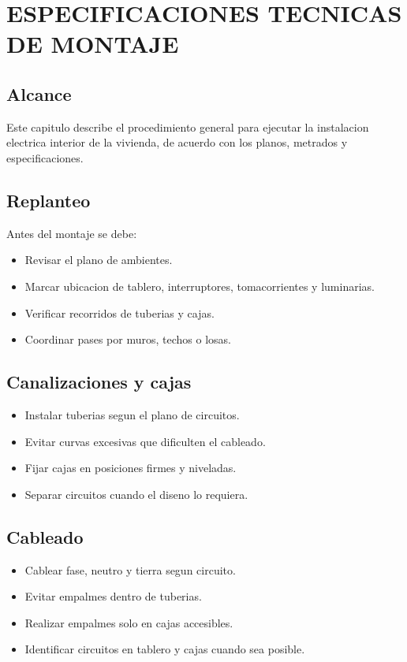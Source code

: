 \chapter{ESPECIFICACIONES TECNICAS DE MONTAJE}

\section{Alcance}

Este capitulo describe el procedimiento general para ejecutar la instalacion electrica interior de la vivienda, de acuerdo con los planos, metrados y especificaciones.

\section{Replanteo}

Antes del montaje se debe:

\begin{itemize}
  \item Revisar el plano de ambientes.
  \item Marcar ubicacion de tablero, interruptores, tomacorrientes y luminarias.
  \item Verificar recorridos de tuberias y cajas.
  \item Coordinar pases por muros, techos o losas.
\end{itemize}

\section{Canalizaciones y cajas}

\begin{itemize}
  \item Instalar tuberias segun el plano de circuitos.
  \item Evitar curvas excesivas que dificulten el cableado.
  \item Fijar cajas en posiciones firmes y niveladas.
  \item Separar circuitos cuando el diseno lo requiera.
\end{itemize}

\section{Cableado}

\begin{itemize}
  \item Cablear fase, neutro y tierra segun circuito.
  \item Evitar empalmes dentro de tuberias.
  \item Realizar empalmes solo en cajas accesibles.
  \item Identificar circuitos en tablero y cajas cuando sea posible.
\end{itemize}

